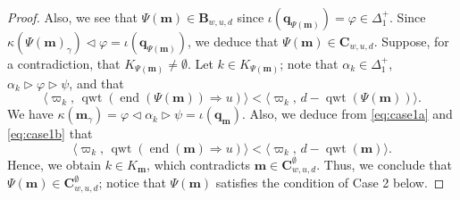 \documentclass[11pt,a4paper,reqno,dvipdfmx]{amsart}
\numberwithin{equation}{section}
\newcommand{\vp}{\varphi}
\newcommand{\vpi}{\varpi}
\newcommand{\bm}{\mathbf{m}}
\newcommand{\bq}{\mathbf{q}}
\newcommand{\bB}{\mathbf{B}}
\newcommand{\bC}{\mathbf{C}}
\DeclareMathOperator{\qwt}{qwt}
\DeclareMathOperator{\ed}{end}
\newcommand{\pair}[2]{\langle #1,\,#2 \rangle}
\theoremstyle{plain}
\theoremstyle{definition}
\theoremstyle{remark}
\begin{document}
\begin{proof}
Also, we see that $\Psi(\bm) \in \bB_{w,u,d}$ 
since $\iota(\bq_{\Psi(\bm)}) = \vp \in \Delta_{1}^{+}$. 
Since $\kappa( \Psi(\bm)_{\gamma} ) \lhd \vp = \iota(\bq_{\Psi(\bm)})$, 
we deduce that $\Psi(\bm) \in \bC_{w,u,d}$. 
%
Suppose, for a contradiction, that $K_{\Psi(\bm)} \ne \emptyset$. 
Let $k \in K_{\Psi(\bm)}$; note that $\alpha_{k} \in \Delta_{1}^{+}$, 
$\alpha_{k} \rhd \vp \rhd \psi$, and that 
%
\begin{equation*}
\pair{\vpi_{k}}{\qwt(\ed(\Psi(\bm)) \Rightarrow u)} < \pair{\vpi_{k}}{d- \qwt(\Psi(\bm))}.
\end{equation*}
%
We have $\kappa(\bm_{\gamma}) = \vp \lhd \alpha_{k} \rhd \psi = \iota(\bq_{\bm})$. 
Also, we deduce from \eqref{eq:case1a} and \eqref{eq:case1b} that 
%
\begin{equation*}
\pair{\vpi_{k}}{\qwt(\ed(\bm) \Rightarrow u)} < \pair{\vpi_{k}}{d- \qwt(\bm)}.
\end{equation*}
%
Hence, we obtain $k \in K_{\bm}$, which contradicts $\bm \in \bC_{w,u,d}^{\emptyset}$. 
Thus, we conclude that $\Psi(\bm) \in \bC_{w,u,d}^{\emptyset}$; notice that 
$\Psi(\bm)$ satisfies the condition of Case 2 below.

\medskip


\end{proof}
\end{document}
